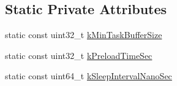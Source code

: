 \subsection*{Static Private Attributes}
\begin{DoxyCompactItemize}
\item 
static const uint32\-\_\-t \hyperlink{classapollo_1_1cyber_1_1record_1_1PlayTaskProducer_ab5ce8efb0daa8c2fc23ad91b946853c9}{k\-Min\-Task\-Buffer\-Size}
\item 
static const uint32\-\_\-t \hyperlink{classapollo_1_1cyber_1_1record_1_1PlayTaskProducer_a68a2a00fe9e5a6c1cfcb0cee8f1766af}{k\-Preload\-Time\-Sec}
\item 
static const uint64\-\_\-t \hyperlink{classapollo_1_1cyber_1_1record_1_1PlayTaskProducer_a453abe5ef6182e100992b8ce44a2545e}{k\-Sleep\-Interval\-Nano\-Sec}
\end{DoxyCompactItemize}


